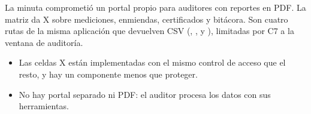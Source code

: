 \documentclass[11pt,a4paper]{article}
\theoremstyle{definition}
\theoremstyle{remark}
\begin{document}
\adrctx La minuta comprometió un portal propio para auditores con reportes en
PDF. La matriz da X sobre mediciones, enmiendas, certificados y bitácora.
\adrdec Son cuatro rutas de la misma aplicación que devuelven CSV
(, ,
 y ), limitadas por C7
a la ventana de auditoría.
\adrpos
\begin{itemize}
  \item Las celdas X están implementadas con el mismo control de acceso que el
    resto, y hay un componente menos que proteger.
\end{itemize}
\adrneg
\begin{itemize}
  \item No hay portal separado ni PDF: el auditor procesa los datos con sus
    herramientas.
\end{itemize}
\end{document}
